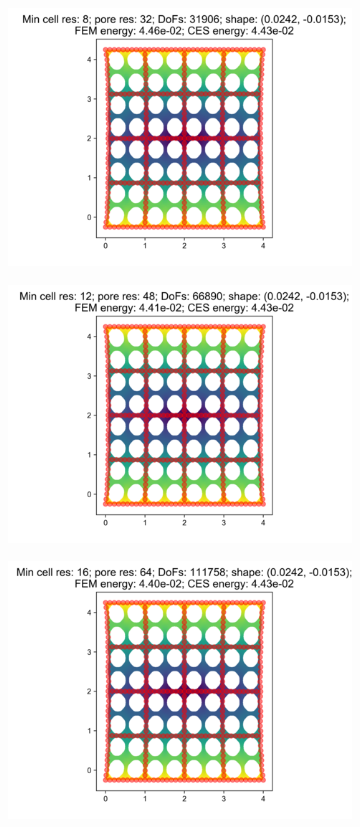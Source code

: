 \begin{figure}[H]
\begin{subfigure}{.45\textwidth}
\end{subfigure}
\begin{subfigure}{.45\textwidth}
  \centering
  \includegraphics[width=.8\linewidth]{lces/vis_tension/bm_5_mesh_3.png}
\end{subfigure}
\newline
\begin{subfigure}{.45\textwidth}
  \centering
  \includegraphics[width=.8\linewidth]{lces/vis_tension/bm_5_mesh_4.png}
\end{subfigure}
\begin{subfigure}{.45\textwidth}
  \centering
  \includegraphics[width=.8\linewidth]{lces/vis_tension/bm_5_mesh_5.png}
\end{subfigure}
\end{figure}

